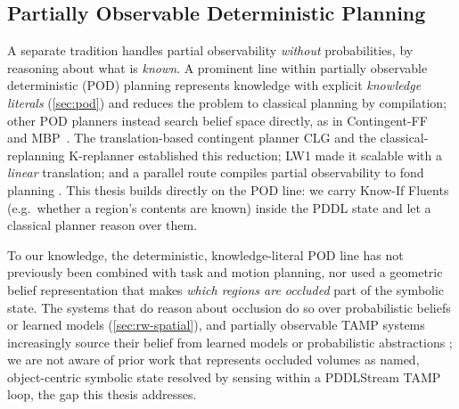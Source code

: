 \subsection{Partially Observable Deterministic Planning}
A separate tradition handles partial observability \emph{without} probabilities, by reasoning about what is \emph{known}. A prominent line within partially observable deterministic (POD) planning represents knowledge with explicit \emph{knowledge literals} (\cref{sec:pod}) and reduces the problem to classical planning by compilation; other POD planners instead search belief space directly, as in Contingent-FF~\cite{hoffmann2005contingent} and MBP~\cite{bertoli2001planning}. The translation-based contingent planner CLG \cite{albore2009translation} and the classical-replanning K-replanner \cite{bonet2011planning} established this reduction; LW1 \cite{bonet2014flexible} made it scalable with a \emph{linear} translation; and a parallel route compiles partial observability to \ac{fond} planning \cite{muise2014computing}. This thesis builds directly on the POD line: we carry Know-If Fluents (e.g.\ whether a region's contents are known) inside the PDDL state and let a classical planner reason over them.

To our knowledge, the deterministic, knowledge-literal POD line has not previously been combined with task and motion planning, nor used a geometric belief representation that makes \emph{which regions are occluded} part of the symbolic state. The systems that do reason about occlusion do so over probabilistic beliefs or learned models (\cref{sec:rw-spatial}), and partially observable TAMP systems increasingly source their belief from learned models \cite{zhao2025seeing, kim2026llmguided} or probabilistic abstractions \cite{curtis2024partially}; we are not aware of prior work that represents occluded volumes as named, object-centric symbolic state resolved by sensing within a PDDLStream TAMP loop, the gap this thesis addresses.

